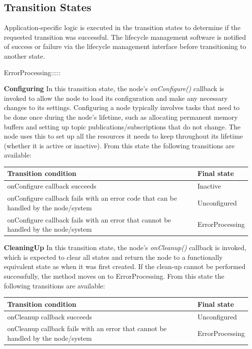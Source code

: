 	\subsection{Transition States} 
	Application-specific logic is executed in the transition states to determine if the requested transition was successful. The lifecycle management software is notified of success or failure via the lifecycle management interface before transitioning to another state.
	\begin{labeling}{ErrorProcessing:::::}
		\item[\textbf{Configuring}] In this transition state, the node's \textit{onConfigure()} callback is invoked to allow the node to load its configuration and make any necessary changes to its settings. Configuring a node typically involves tasks that need to be done once during the node's lifetime, such as allocating permanent memory buffers and setting up topic publications/subscriptions that do not change. The node uses this to set up all the resources it needs to keep throughout its lifetime (whether it is active or inactive). 
		From this state the following transitions are available:
		\begin{table}[H]
			\flushright
			\label{tab:Valid transitions}
			\begin{tabular}{|p{8.5cm}|p{3cm}|}
				\toprule
				Transition condition & Final state\\
				\midrule
				onConfigure callback succeeds & Inactive  \\
				onConfigure callback fails with an error code that can be handled by the node/system & Unconfigured \\
				onConfigure callback fails with an error that cannot be handled by the node/system  & ErrorProcessing \\
				\bottomrule
			\end{tabular}
		\end{table}

		\item[\textbf{CleaningUp}] In this transition state, the node's \textit{onCleanup()} callback is invoked, which is expected to clear all states and return the node to a functionally equivalent state as when it was first created. If the clean-up cannot be performed successfully, the method moves on to ErrorProcessing.
		From this state the following transitions are available:
		\begin{table}[H]
			\flushright
			\label{tab:Valid transitions}
			\begin{tabular}{|p{8.5cm}|p{3cm}|}
				\toprule
				Transition condition & Final state\\
				\midrule
				onCleanup callback succeeds & Unconfigured \\
				onCleanup callback fails with an error that cannot be handled by the node/system  & ErrorProcessing \\
				\bottomrule
			\end{tabular}
		\end{table}


\end{labeling}
